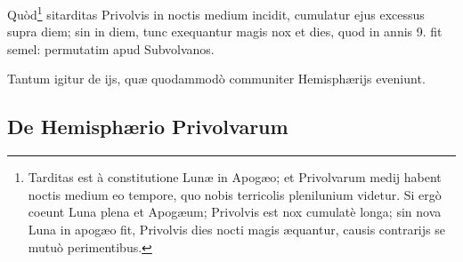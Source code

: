 \documentclass[a4paper, 11pt, oneside, polutonikogreek, german]{article}
\begin{document}
Quòd\footnote{Tarditas est à constitutione Lunæ in Apogæo; et Privolvarum medij habent noctis medium eo tempore, quo nobis terricolis plenilunium videtur. Si ergò coeunt Luna plena et Apogæum; Privolvis est nox cumulatè longa; sin nova Luna in apogæo fit, Privolvis dies nocti magis æquantur, causis contrarijs se mutuò perimentibus.} sitarditas Privolvis in noctis medium incidit, cumulatur ejus excessus supra diem; sin in diem, tunc exequantur magis nox et dies, quod in annis 9. fit semel: permutatim apud Subvolvanos.

Tantum igitur de ijs, quæ quodammodò communiter Hemisphærijs eveniunt.

\subsection{De Hemisphærio Privolvarum}
\end{document}
